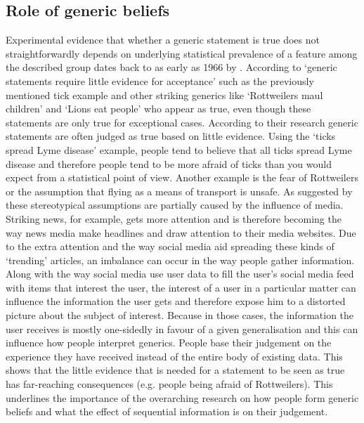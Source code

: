 \documentclass[twoside]{uva-inf-bachelor-thesis}
\theoremstyle{definition}
\begin{document}
\subsection{Role of generic beliefs}
Experimental evidence that whether a generic statement is true does not straightforwardly depends on underlying statistical prevalence of a feature among the described group dates back to as early as 1966 by \cite{gilson1965subjective}. According to \cite{cimpian2010generic} `generic statements require little evidence for acceptance' such as the previously mentioned tick example and other striking generics like `Rottweilers maul children' and `Lions eat people' who appear as true, even though these statements are only true for exceptional cases. According to their research generic statements are often judged as true based on little evidence. Using the `ticks spread Lyme disease' example, people tend to believe that all ticks spread Lyme disease and therefore people tend to be more afraid of ticks than you would expect from a statistical point of view. Another example is the fear of Rottweilers or the assumption that flying as a means of transport is unsafe. As suggested by \cite{van2020generics} these stereotypical assumptions are partially caused by the influence of media. Striking news, for example, gets more attention and is therefore becoming the way news media make headlines and draw attention to their media websites. Due to the extra attention and the way social media aid spreading these kinds of `trending' articles, an imbalance can occur in the way people gather information. Along with the way social media use user data to fill the user's social media feed with items that interest the user, the interest of a user in a particular matter can influence the information the user gets and therefore expose him to a distorted picture about the subject of interest. Because in those cases, the information the user receives is mostly one-sidedly in favour of a given generalisation and this can influence how people interpret generics. People base their judgement on the experience they have received instead of the entire body of existing data. This shows that the little evidence that is needed for a statement to be seen as true has far-reaching consequences (e.g. people being afraid of Rottweilers). This underlines the importance of the overarching research on how people form generic beliefs and what the effect of sequential information is on their judgement.
\end{document}
